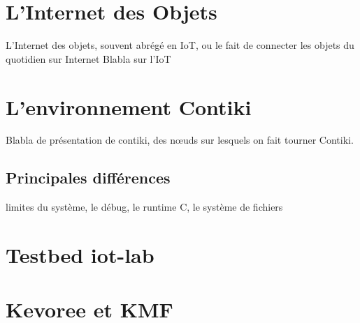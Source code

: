 \section{L'Internet des Objets}

L'Internet des objets, souvent abrégé en IoT, ou le fait de connecter les objets du quotidien sur Internet  
Blabla sur l'IoT

\section{L'environnement Contiki}

Blabla de présentation de contiki, des nœuds sur lesquels on fait tourner Contiki.

\subsection{Principales différences}

limites du système, le débug, le runtime C, le système de fichiers


\section{Testbed iot-lab}


\section{Kevoree et KMF}